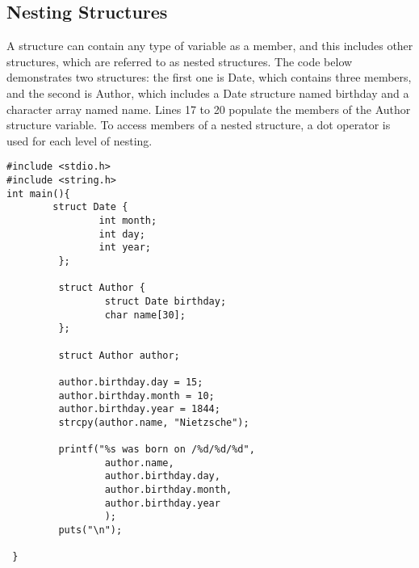 \subsection{Nesting Structures}
A structure can contain any type of variable as a member, and this includes other structures,
which are referred to as nested structures. The code below demonstrates two structures:
the first one is Date, which contains three members, 
and the second is Author, which includes a Date structure named birthday and a character
array named name. Lines 17 to 20 populate the members of the Author structure variable.
To access members of a nested structure, a dot operator is used for each level of nesting.
\begin{lstlisting}
#include <stdio.h>
#include <string.h>
int main(){
        struct Date {
                int month;
                int day;
                int year;
         };

         struct Author {
                 struct Date birthday;
                 char name[30];
         };

         struct Author author;

         author.birthday.day = 15;
         author.birthday.month = 10;
         author.birthday.year = 1844;
         strcpy(author.name, "Nietzsche");

         printf("%s was born on /%d/%d/%d",
                 author.name,
                 author.birthday.day,
                 author.birthday.month,
                 author.birthday.year
                 );
         puts("\n");

 }
\end{lstlisting}

